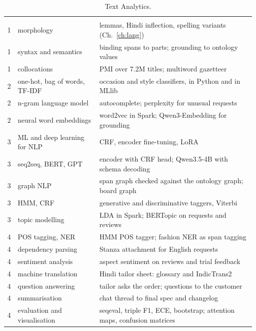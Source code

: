 \begin{table}[h]
\centering\small
\caption{Text Analytics.}
\begin{tabularx}{\textwidth}{@{}P{1.2cm}P{4.6cm}L@{}}
 &  & \\
1 & morphology & lemmas, Hindi inflection, spelling variants (Ch.~\ref{ch:lang})\\
1 & syntax and semantics & binding spans to parts; grounding to ontology values\\
1 & collocations & PMI over 7.2M titles; multiword gazetteer\\
2 & one-hot, bag of words, TF-IDF & occasion and style classifiers, in Python and in MLlib\\
2 & n-gram language model & autocomplete; perplexity for unusual requests\\
2 & neural word embeddings & word2vec in Spark; Qwen3-Embedding for grounding\\
3 & ML and deep learning for NLP & CRF, encoder fine-tuning, LoRA\\
3 & seq2seq, BERT, GPT & encoder with CRF head; Qwen3.5-4B with schema decoding\\
3 & graph NLP & span graph checked against the ontology graph; board graph\\
3 & HMM, CRF & generative and discriminative taggers, Viterbi\\
3 & topic modelling & LDA in Spark; BERTopic on requests and reviews\\
4 & POS tagging, NER & HMM POS tagger; fashion NER as span tagging\\
4 & dependency parsing & Stanza attachment for English requests\\
4 & sentiment analysis & aspect sentiment on reviews and trial feedback\\
4 & machine translation & Hindi tailor sheet: glossary and IndicTrans2\\
4 & question answering & tailor asks the order; questions to the customer\\
4 & summarisation & chat thread to final spec and changelog\\
4 & evaluation and visualisation & seqeval, triple F1, ECE, bootstrap; attention maps, confusion matrices\\
\end{tabularx}
\end{table}

